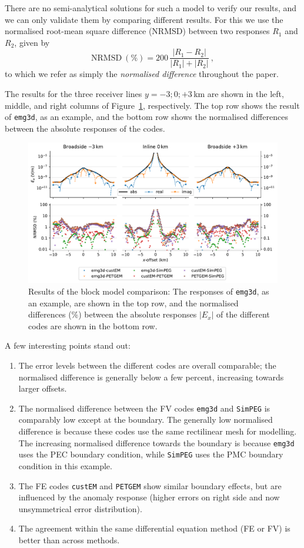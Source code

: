 \documentclass[onecolumn,extra,camera]{gji}
\newcommand{\mr}[1]{\mathrm{#1}}
\newcommand{\emg}[2]{\texttt{emg#1#2}\xspace}
\newcommand{\simpeg}{\texttt{SimPEG}\xspace}
\newcommand{\custem}{\texttt{custEM}\xspace}
\newcommand{\petgem}{\texttt{PETGEM}\xspace}
\begin{document}
There are no semi-analytical solutions for such a model to verify our results, and we can only validate them by comparing different results. For this we use the normalised root-mean square difference (NRMSD) between two responses $R_1$ and $R_2$, given by
%
\begin{equation}
  \mr{NRMSD~(\%)} = 200\,\frac{|R_1 - R_2|}{|R_1| + |R_2|}\ ,
  \label{eq:nrmsd}
\end{equation}
%
to which we refer as simply the \emph{normalised difference} throughout the paper.

The results for the three receiver lines $y=-3;0;+3\,$km are shown in the left, middle, and right columns of Figure~\ref{fig:results-block}, respectively. The top row shows the result of \emg3d, as an example, and the bottom row shows the normalised differences between the absolute responses of the codes.
%
\begin{figure}
  \centering
  \includegraphics[width=.9\linewidth]{figures/results-block}
  \caption{Results of the block model comparison: The responses of \emg3d, as an example, are shown in the top row, and the normalised differences (\%) between the absolute responses $|E_x|$ of the different codes are shown in the bottom row.}
  \label{fig:results-block}
\end{figure}
%

A few interesting points stand out:
\begin{enumerate}
  \item The error levels between the different codes are overall comparable; the normalised difference is generally below a few percent, increasing towards larger offsets.
  \item The normalised difference between the FV codes \emg3d and \simpeg is comparably low except at the boundary. The generally low normalised difference is because these codes use the same rectilinear mesh for modelling. The increasing normalised difference towards the boundary is because \emg3d uses the PEC boundary condition, while \simpeg uses the PMC boundary condition in this example.
  \item The FE codes \custem and \petgem show similar boundary effects, but are influenced by the anomaly response (higher errors on right side and now unsymmetrical error distribution).
  \item The agreement within the same differential equation method (FE or FV) is better than across methods.
\end{enumerate}
\end{document}
